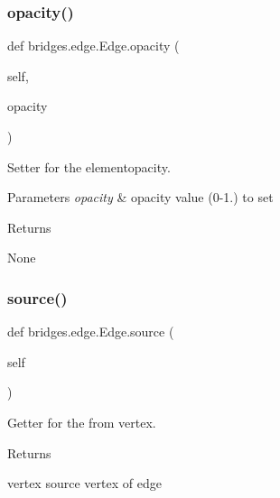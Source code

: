 \subsubsection{\texorpdfstring{opacity()}{opacity()}\hspace{0.1cm}{\footnotesize\ttfamily [2/2]}}
{\footnotesize\ttfamily def bridges.\+edge.\+Edge.\+opacity (\begin{DoxyParamCaption}\item[{}]{self,  }\item[{}]{opacity }\end{DoxyParamCaption})}



Setter for the elementopacity. 


\begin{DoxyParams}{Parameters}
{\em opacity} & opacity value (0-\/1.) to set \\
\hline
\end{DoxyParams}
\begin{DoxyReturn}{Returns}


None 
\end{DoxyReturn}
\mbox{\label{classbridges_1_1edge_1_1_edge_a70271a1d9eaf4b6bdda3179b6821703e}} 
\subsubsection{\texorpdfstring{source()}{source()}}
{\footnotesize\ttfamily def bridges.\+edge.\+Edge.\+source (\begin{DoxyParamCaption}\item[{}]{self }\end{DoxyParamCaption})}



Getter for the from vertex. 

\begin{DoxyReturn}{Returns}


vertex source vertex of edge 
\end{DoxyReturn}
\mbox{\label{classbridges_1_1edge_1_1_edge_a1155b5f604410cd46a81902bb8aa348b}} 
